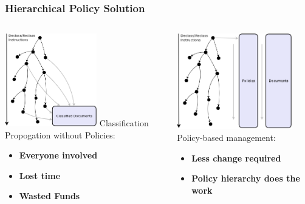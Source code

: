 \documentclass[t,handout, 10pt]{beamer}
\begin{document}
\begin{frame}
\frametitle{Hierarchical Policy Solution}

\begin{columns}[T]
\begin{column}{5cm}
\includegraphics[width=4cm]{hierarchy-1}
\newline
\newline
Classification Propogation without Policies:
\newline
\begin{itemize}
\item \textbf{Everyone involved}
\item \textbf{Lost time}
\item \textbf{Wasted Funds}
\end{itemize}
\end{column}
\begin{column}{5cm}
\includegraphics[width=5cm]{hierarchy-2}
\newline
\newline
Policy-based management:
\newline
\begin{itemize}
\item \textbf{Less change required}
\item \textbf{Policy hierarchy does the work}
\end{itemize}
\end{column}
\end{columns}

\end{frame}
\end{document}
